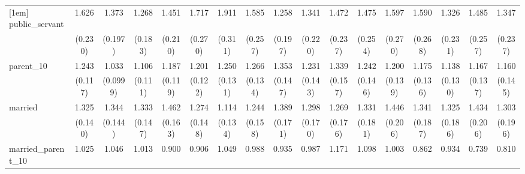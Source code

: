 {\begin{tabular}{l*{16}{c}}
[1em]
public\_servant      &       1.626\sym{***}&       1.373\sym{*}  &       1.268         &       1.451\sym{*}  &       1.717\sym{***}&       1.911\sym{***}&       1.585\sym{**} &       1.258         &       1.341         &       1.472\sym{*}  &       1.475\sym{*}  &       1.597\sym{**} &       1.590\sym{**} &       1.326         &       1.485\sym{*}  &       1.347         \\
                    &     (0.230)         &     (0.197)         &     (0.183)         &     (0.210)         &     (0.270)         &     (0.311)         &     (0.257)         &     (0.197)         &     (0.220)         &     (0.237)         &     (0.254)         &     (0.270)         &     (0.268)         &     (0.231)         &     (0.257)         &     (0.237)         \\
[1em]
parent\_10           &       1.243\sym{*}  &       1.033         &       1.106         &       1.187         &       1.201         &       1.250\sym{*}  &       1.266\sym{*}  &       1.353\sym{**} &       1.231         &       1.339\sym{*}  &       1.242         &       1.200         &       1.175         &       1.138         &       1.167         &       1.160         \\
                    &     (0.117)         &    (0.0999)         &     (0.111)         &     (0.119)         &     (0.122)         &     (0.131)         &     (0.134)         &     (0.147)         &     (0.143)         &     (0.157)         &     (0.146)         &     (0.139)         &     (0.136)         &     (0.130)         &     (0.137)         &     (0.145)         \\
[1em]
married             &       1.325\sym{**} &       1.344\sym{**} &       1.333\sym{**} &       1.462\sym{***}&       1.274\sym{*}  &       1.114         &       1.244         &       1.389\sym{**} &       1.298\sym{*}  &       1.269         &       1.331\sym{*}  &       1.446\sym{**} &       1.341\sym{*}  &       1.325\sym{*}  &       1.434\sym{*}  &       1.303         \\
                    &     (0.140)         &     (0.144)         &     (0.147)         &     (0.163)         &     (0.148)         &     (0.134)         &     (0.158)         &     (0.171)         &     (0.170)         &     (0.176)         &     (0.181)         &     (0.206)         &     (0.187)         &     (0.186)         &     (0.206)         &     (0.196)         \\
[1em]
married\_parent\_10   &       1.025         &       1.046         &       1.013         &       0.900         &       0.906         &       1.049         &       0.988         &       0.935         &       0.987         &       1.171         &       1.098         &       1.003         &       0.862         &       0.934         &       0.739         &       0.810         \\

\end{tabular}}
